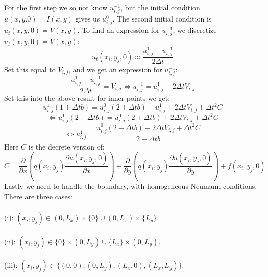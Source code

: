 \documentclass[11pt,a4paper]{report}
\begin{document}
For the first step we so not know $u_{i,j}^{-1} $, but the initial condition $u(x,y.0)=I(x,y)$ gives us $u_{i,j}^{0}$. The second initial condition is $u_t(x,y,0)=V(x,y)$. To find an expression for $u_{i,j}^{-1}$, we discretize $u_t(x,y,0)=V(x,y)$: $$u_t(x_i,y_j,0) \approx \frac{u_{i,j}^{1}-u_{i,j}^{-1}}{2\Delta t}$$ Set this equal to $V_{i,j}$, and we get an expression for $u_{i,j}^{-1} $: $$\frac{u_{i,j}^{1}-u_{i,j}^{-1}}{2\Delta t} =V_{i,j} \iff u_{i,j}^{-1} = u_{i,j}^{1} -2\Delta t V_{i,j} $$  
Set this into the above result for inner points we get: $$u_{i,j}^{1}(1+\Delta t b)=u_{i,j}^0(2+\Delta t b)-u_{i,j}^{1}+2\Delta t V_{i,j}+\Delta t^2 C $$ $$\iff u_{i,j}^{1}(2+\Delta t b)=u_{i,j}^0(2+\Delta t b)+2\Delta t V_{i,j}+\Delta t^2 C $$ $$\iff u_{i,j}^{1} = \frac{u_{i,j}^0(2+\Delta t b)+2\Delta t V_{i,j}+\Delta t^2 C}{2+\Delta t b} $$
Here $C$ is the decrete version of: $$C=\frac{\partial }{\partial x}(q(x_i,y_j)\frac{\partial u(x_i,y_j,0)}{\partial x}) +\frac{\partial }{\partial y}(q(x_i,y_j)\frac{\partial u(x_i,y_j,0)}{\partial y})+f(x_i,y_j,0)$$
Lastly we need to handle the boundary, with homogeneous Neumann conditions. There are three cases:
\\
\\
(i): $(x_i,y_j) \in (0,L_x)\times \{ 0\} \cup (0,L_x)\times \{ L_y\} $.
\\
\\
(ii): $(x_i,y_j) \in \{ 0\}\times(0,L_y)  \cup  \{ L_x\} \times (0,L_y)$.
\\
\\
(iii): $(x_i,y_j) \in \{(0,0),(0,L_y),(L_x,0),(L_x,L_y)  \}$.
\\
\\
\end{document}
